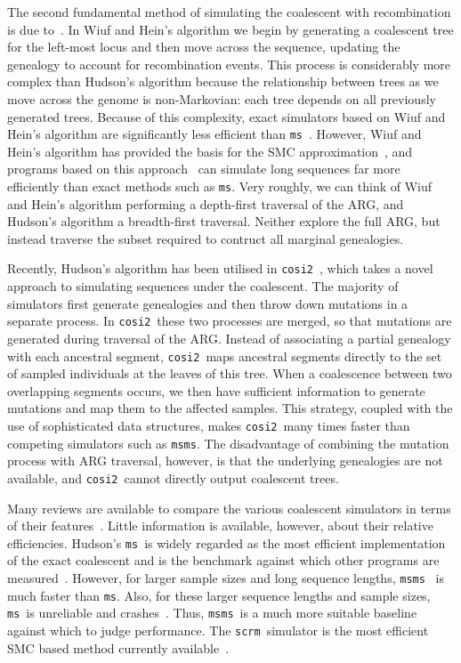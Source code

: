 \documentclass[10pt]{article}
\newcommand{\ms}[0]{\texttt{ms}}
\newcommand{\msms}[0]{\texttt{msms}}
\newcommand{\scrm}[0]{\texttt{scrm}}
\newcommand{\cosi}[0]{\texttt{cosi2}}
\begin{document}
The second fundamental method of simulating the coalescent with recombination
is due to~\citet{wh99}. In Wiuf and Hein's algorithm we begin by generating a
coalescent tree for the left-most locus and then move across the sequence,
updating the genealogy to account for recombination events. This process is
considerably more complex than Hudson's algorithm because the relationship
between trees as we move across the genome is non-Markovian: each tree depends
on all previously generated trees. Because of this complexity, exact simulators
based on Wiuf and Hein's algorithm are significantly less efficient than
\ms~\citep{szml14,wzlclmx14}. However, Wiuf and Hein's algorithm has provided the
basis for the SMC approximation~\citep{mc05,mw06}, and programs based on
this approach~\citep{cmw09,ef11,szml14} can simulate long sequences far more
efficiently than exact methods such as \ms. Very roughly, we can think of
Wiuf and Hein's algorithm performing a depth-first traversal of the ARG, and
Hudson's algorithm a breadth-first traversal. Neither explore the full ARG,
but instead traverse the subset required to contruct all marginal genealogies.

Recently, Hudson's algorithm has been utilised in \cosi~\citep{sss14}, which
takes a novel approach to simulating sequences under the coalescent. The
majority of simulators first generate genealogies and then throw down mutations
in a separate process. In \cosi\ these two processes are merged, so that
mutations are generated during traversal of the ARG. Instead of associating a
partial genealogy with each ancestral segment, \cosi\ maps ancestral segments
directly to the set of sampled individuals at the leaves of this tree. When a
coalescence between two overlapping segments occurs, we then have sufficient
information to generate mutations and map them to the affected samples. This
strategy, coupled with the use of sophisticated data structures, makes \cosi\
many times faster than competing simulators such as \msms. The disadvantage of
combining the mutation process with ARG traversal, however, is that the
underlying genealogies are not available, and \cosi\ cannot directly output
coalescent trees.

Many reviews are available to compare the various coalescent simulators in
terms of their features~\citep{c08,law08,a12,ymzhw12,hbg12,ydn14}. Little
information is available, however, about their relative efficiencies.
Hudson's \ms\ is widely regarded as the most efficient implementation of
the exact coalescent and is the benchmark against which other programs are
measured~\citep{mw06,cmw09,ef11,szml14,ydn14,wzlclmx14}. However,
for larger sample sizes and long sequence lengths, \msms~\citep{eh10}
is much faster than \ms. Also, for these larger sequence lengths and sample
sizes, \ms\ is unreliable and crashes~\citep{ef11,ydn14}. Thus,
\msms\ is a much more suitable baseline against which to judge performance.
The \scrm\ simulator is the most efficient SMC based
method currently available~\citep{szml14}.
\end{document}
